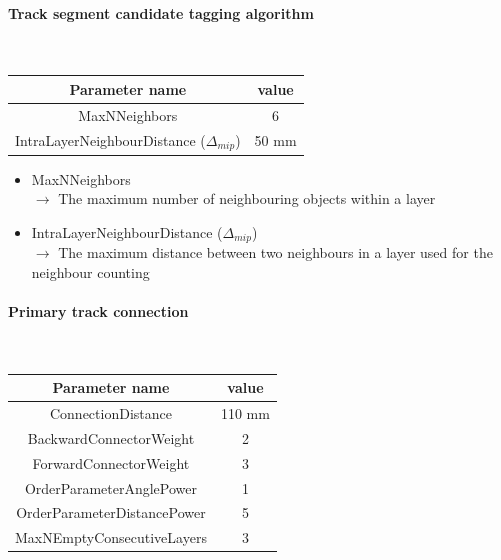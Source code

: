 \documentclass[12pt]{article}
\begin{document}
\paragraph{Track segment candidate tagging algorithm} ~

\begin{table}[!h]
  \begin{center}
    \begin{tabu} to \linewidth { c | c } 
          Parameter name & value \\
          \hline
          MaxNNeighbors & 6 \\
          IntraLayerNeighbourDistance ($\Delta_{mip}$) & 50 mm
    \end{tabu} 
  \end{center}
\end{table}

\begin{itemize}
  \item MaxNNeighbors \\
  $\rightarrow$ The maximum number of neighbouring objects within a layer
  \item IntraLayerNeighbourDistance ($\Delta_{mip}$) \\
  $\rightarrow$ The maximum distance between two neighbours in a layer used for the neighbour counting
\end{itemize}

\newpage
\paragraph{Primary track connection} ~

\begin{table}[!ht]
  \begin{center}
    \begin{tabu} to \linewidth { c | c } 
          Parameter name & value \\
          \hline
          ConnectionDistance & 110 mm \\ 
          BackwardConnectorWeight & 2 \\ 
          ForwardConnectorWeight & 3 \\ 
          OrderParameterAnglePower & 1 \\ 
          OrderParameterDistancePower & 5 \\
          MaxNEmptyConsecutiveLayers & 3 
    \end{tabu} 
  \end{center}
\end{table}
\end{document}
